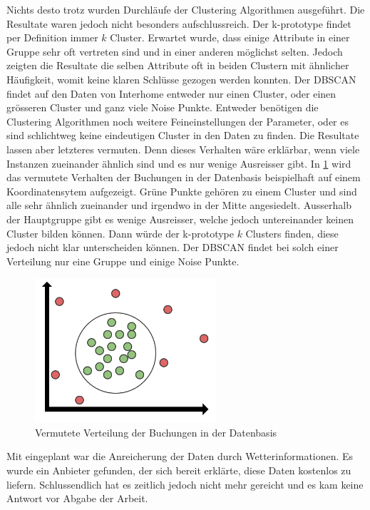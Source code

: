 Nichts desto trotz wurden Durchläufe der Clustering Algorithmen ausgeführt. Die Resultate waren jedoch nicht besonders aufschlussreich. Der k-prototype findet per Definition immer $k$ Cluster. Erwartet wurde, dass einige Attribute in einer Gruppe sehr oft vertreten sind und in einer anderen möglichst selten. Jedoch zeigten die Resultate die selben Attribute oft in beiden Clustern mit ähnlicher Häufigkeit, womit keine klaren Schlüsse gezogen werden konnten. Der DBSCAN findet auf den Daten von Interhome entweder nur einen Cluster, oder einen grösseren Cluster und ganz viele Noise Punkte. Entweder benötigen die Clustering Algorithmen noch weitere Feineinstellungen der Parameter, oder es sind schlichtweg keine eindeutigen Cluster in den Daten zu finden. Die Resultate lassen aber letzteres vermuten. Denn dieses Verhalten wäre erklärbar, wenn viele Instanzen zueinander ähnlich sind und es nur wenige Ausreisser gibt. In \cref{fig:proofofconcept:fazit:2} wird das vermutete Verhalten der Buchungen in der Datenbasis beispielhaft auf einem Koordinatensytem aufgezeigt. Grüne Punkte gehören zu einem Cluster und sind alle sehr ähnlich zueinander und irgendwo in der Mitte angesiedelt. Ausserhalb der Hauptgruppe gibt es wenige Ausreisser, welche jedoch untereinander keinen Cluster bilden können. Dann würde der k-prototype $k$ Clusters finden, diese jedoch nicht klar unterscheiden können. Der DBSCAN findet bei solch einer Verteilung nur eine Gruppe und einige Noise Punkte.

\begin{figure}[H]
	\RawFloats
	\centering
	\includegraphics[width=0.6\textwidth]{images/expected-data-distribution}
	\caption{Vermutete Verteilung der Buchungen in der Datenbasis}
	\label{fig:proofofconcept:fazit:2}
\end{figure}

Mit eingeplant war die Anreicherung der Daten durch Wetterinformationen. Es wurde ein Anbieter gefunden, der sich bereit erklärte, diese Daten kostenlos zu liefern. Schlussendlich hat es zeitlich jedoch nicht mehr gereicht und es kam keine Antwort vor Abgabe der Arbeit.